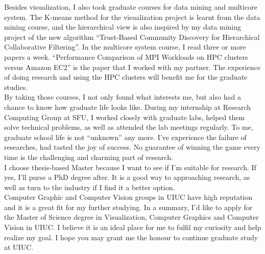 \documentclass{article}
\begin{document}
Besides visualization, I also took graduate courses for data mining and multicore system. The K-means method for the visualization project is learnt from the data mining course, and the hierarchical view is also inspired by my data mining project of the new algorithm ``Trust-Based Community Discovery for Hierarchical Collaborative Filtering''. In the multicore system course, I read three or more papers a week. ``Performance Comparison of MPI Workloads on HPC clusters versus Amazon EC2'' is the paper that I worked with my partner. The experience of doing research and using the HPC clusters will benefit me for the graduate studies.  \\


By taking those courses, I not only found what interests me, but also had a chance to know how graduate life looks like. During my internship at Research Computing Group at SFU, I worked closely with graduate labs, helped them solve technical problems, as well as attended the lab meetings regularly. To me, graduate school life is not ``unknown'' any more. I've experience the failure of researches, had tasted the joy of success. No guarantee of winning the game every time is the challenging and charming part of research. \\

I choose thesis-based Master because I want to see if I'm suitable for research. If yes, I'll purse a PhD degree after. It is a good way to approaching research, as well as turn to the industry if I find it a better option.\\

Computer Graphic and Computer Vision groups in UIUC have high reputation and it is a great fit for my further studying. In a summary, I'd like to apply for the Master of Science degree in Visualization, Computer Graphics and Computer Vision in UIUC. I believe it is an ideal place for me to fulfil my curiosity and help realize my goal. I hope you may grant me the honour to continue graduate study at UIUC.  \\
\end{document}
